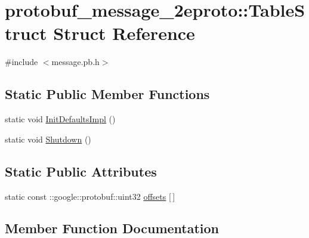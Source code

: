 \hypertarget{structprotobuf__message__2eproto_1_1_table_struct}{}\section{protobuf\+\_\+message\+\_\+2eproto\+:\+:Table\+Struct Struct Reference}
\label{structprotobuf__message__2eproto_1_1_table_struct}


{\ttfamily \#include $<$message.\+pb.\+h$>$}

\subsection*{Static Public Member Functions}
\begin{DoxyCompactItemize}
\item 
static void \hyperlink{structprotobuf__message__2eproto_1_1_table_struct_a931144a94610d8291bdc069fc26e7ab8}{Init\+Defaults\+Impl} ()
\item 
static void \hyperlink{structprotobuf__message__2eproto_1_1_table_struct_a8c182e97d2bb09fccca5b2b5c9a626d9}{Shutdown} ()
\end{DoxyCompactItemize}
\subsection*{Static Public Attributes}
\begin{DoxyCompactItemize}
\item 
static const \+::google\+::protobuf\+::uint32 \hyperlink{structprotobuf__message__2eproto_1_1_table_struct_a231499f7ef7234621ad122488be7e3ea}{offsets} \mbox{[}$\,$\mbox{]}
\end{DoxyCompactItemize}


\subsection{Member Function Documentation}
